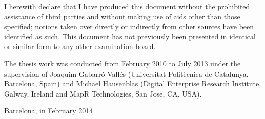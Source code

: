 


\begin{declaration}        %

I herewith declare that I have produced this document without the prohibited assistance of third parties and without making use of aids other than those specified; notions taken over directly or indirectly from other sources have been identified as such. This document has not previously been presented in identical or similar form to any other examination board.

The thesis work was conducted from February 2010 to July 2013 under the supervision of Joaquim Gabarró Vallés (Universitat Politècnica de Catalunya, Barcelona, Spain) and Michael Hausenblas (Digital Enterprise Research Institute, Galway, Ireland and MapR Technologies, San Jose, CA, USA).

\vspace{10mm}

Barcelona, in February 2014

\end{declaration}

\cleardoublepage

